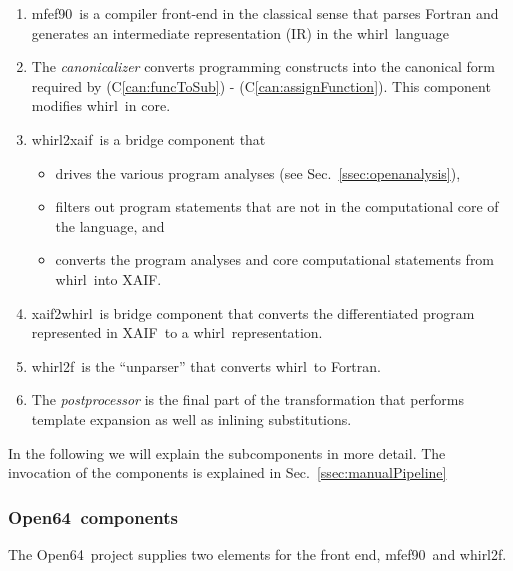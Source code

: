 \documentclass[11pt]{article}
\newcommand{\mfefninety}{mfef90}
\newcommand{\OpenSixtyFour}{Open64}
\newcommand{\xaif}{XAIF}
\newcommand{\whirl}{whirl}
\newcommand{\whirlToxaif}{whirl2xaif}
\newcommand{\whirlTof}{whirl2f}
\newcommand{\xaifTowhirl}{xaif2whirl}
\newcommand{\refcan}[1]{(C\ref{#1})}
\newcommand{\refsec}[1]{{Sec.~\ref{#1}}}
\begin{document}
\begin{enumerate}	
\item \mfefninety\ is a compiler front-end in the classical sense that parses
  Fortran and generates an intermediate representation (IR)
  in the \whirl\ language

\item The {\em canonicalizer} converts  
  programming constructs into the canonical form required by 
  \refcan{can:funcToSub} - \refcan{can:assignFunction}. 
  This component modifies \whirl\ in core.

\item \whirlToxaif\ is a bridge component that
  \begin{itemize}
  \item drives the various program analyses (see \refsec{ssec:openanalysis}),

  \item filters out program statements that are not in the
    computational core of the language, and 

  \item converts the program analyses and core computational
    statements from \whirl\ into \xaif.
  \end{itemize}

\item \xaifTowhirl\ is bridge component that converts the 
  differentiated program represented in \xaif\ 
  to a \whirl\ representation.

\item \whirlTof\ is the ``unparser'' that converts \whirl\ to
  Fortran.

\item The {\em postprocessor} is the  final part of the transformation that
  performs template expansion as well as inlining substitutions.

\end{enumerate}

In the following we will explain the subcomponents in more detail.
The invocation of the components is explained in
\refsec{ssec:manualPipeline}

\subsubsection{\OpenSixtyFour\ components} \label{sssec:mfef}

The \OpenSixtyFour\ project \cite{open64Web} supplies two elements for
the front end, \mfefninety\ and \whirlTof.
\end{document}

